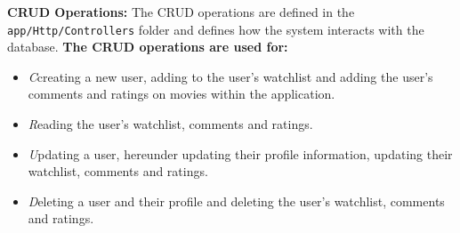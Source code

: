 \textbf{CRUD Operations:}
The CRUD operations are defined in the \texttt{app/Http/Controllers} folder and defines how the system interacts with the database.
\textbf{The CRUD operations are used for:}
\begin{itemize}
    \item \textit{C}creating a new user, adding to the user's watchlist and adding the user's comments and ratings on movies within the application.
    \item \textit{R}eading the user's watchlist, comments and ratings.
    \item \textit{U}pdating a user, hereunder updating their profile information, updating their watchlist, comments and ratings.
    \item \textit{D}eleting a user and their profile and deleting the user's watchlist, comments and ratings.
\end{itemize}


